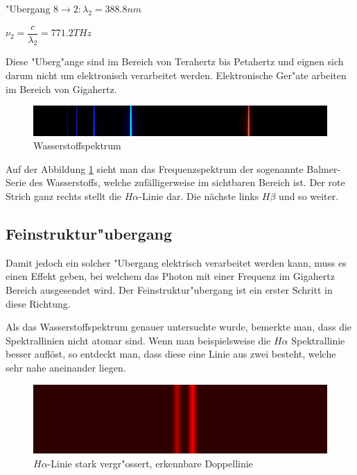 \begin{refsection}
\begin{center}
"Ubergang $8 \rightarrow 2: \lambda_2 = 388.8nm$

$\nu_2 = \dfrac{c}{\lambda_2} = 771.2 THz$
\end{center}	

Diese "Uberg"ange sind im Bereich von Terahertz bis Petahertz und eignen sich darum nicht um elektronisch verarbeitet werden. Elektronische Ger"ate arbeiten im Bereich von Gigahertz.

\begin{figure}[h!]
	\centering
	\includegraphics[width = .6\columnwidth]{../vortrag/pictures/wasserstoffSpektrum.jpg}
	\caption{Wasserstoffspektrum} %
	\label{atomuhr:wasserstoffspektrum}
\end{figure}

Auf der Abbildung \ref{atomuhr:wasserstoffspektrum} sieht man das Frequenzspektrum der sogenannte Balmer-Serie des Wasserstoffs, welche zufälligerweise im sichtbaren Bereich ist. Der rote Strich ganz rechts stellt die $H\alpha$-Linie dar. Die nächste links $H\beta$ und so weiter.


\subsection{Feinstruktur"ubergang}
Damit jedoch ein solcher "Ubergang elektrisch verarbeitet werden kann, muss es einen Effekt geben, bei welchem das Photon mit einer Frequenz im Gigahertz Bereich ausgesendet wird. 
Der Feinstruktur"ubergang ist ein erster Schritt in diese Richtung. 

Als das Wasserstoffspektrum genauer untersuchte wurde, bemerkte man, dass die Spektrallinien nicht atomar sind. Wenn man beispielsweise die $H\alpha$ Spektrallinie besser auflöst, so entdeckt man, dass diese eine Linie aus zwei besteht, welche sehr nahe aneinander liegen. 

\begin{figure}[h!]
	\centering
	\includegraphics[width = .6\columnwidth]{../vortrag/pictures/fine_structure_hydrogen.png}
	\caption{$H\alpha$-Linie stark vergr"ossert, erkennbare Doppellinie} %
\end{figure}


\end{refsection}
